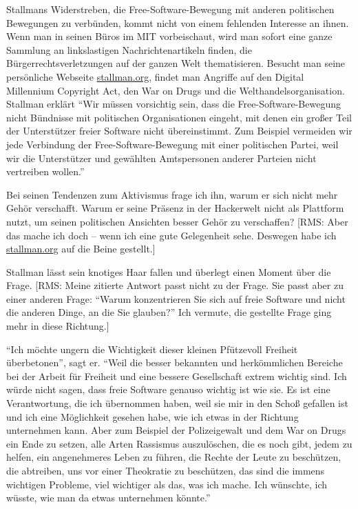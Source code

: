 Stallmans Widerstreben, die Free-Software-Bewegung mit anderen politischen Bewegungen zu verbünden, kommt nicht von einem fehlenden Interesse an ihnen. Wenn man in seinen Büros im MIT vorbeischaut, wird man sofort eine ganze Sammlung an linkslastigen Nachrichtenartikeln finden, die Bürgerrechtsverletzungen auf der ganzen Welt thematisieren. Besucht man seine persönliche Webseite \href{http://stallman.org}{stallman.org}, findet man Angriffe auf den Digital Millennium Copyright Act, den War on Drugs und die Welthandelsorganisation. Stallman erklärt "`Wir müssen vorsichtig sein, dass die Free-Software-Bewegung nicht Bündnisse mit politischen Organisationen eingeht, mit denen ein großer Teil der Unterstützer freier Software nicht übereinstimmt. Zum Beispiel vermeiden wir jede Verbindung der Free-Software-Bewegung mit einer politischen Partei, weil wir die Unterstützer und gewählten Amtspersonen anderer Parteien nicht vertreiben wollen."'

Bei seinen Tendenzen zum Aktivismus frage ich ihn, warum er sich nicht mehr Gehör verschafft. Warum er seine Präsenz in der Hackerwelt nicht als Plattform nutzt, um seinen politischen Ansichten besser Gehör zu verschaffen? [RMS: Aber das mache ich doch – wenn ich eine gute Gelegenheit sehe. Deswegen habe ich \href{http://stallman.org}{stallman.org} auf die Beine gestellt.]

Stallman lässt sein knotiges Haar fallen und überlegt einen Moment über die Frage. [RMS: Meine zitierte Antwort passt nicht zu der Frage. Sie passt aber zu einer anderen Frage: "`Warum konzentrieren Sie sich auf freie Software und nicht die anderen Dinge, an die Sie glauben?"'  Ich vermute, die gestellte Frage ging mehr in diese Richtung.]

"`Ich möchte ungern die Wichtigkeit dieser kleinen Pfützevoll Freiheit überbetonen"', sagt er. "`Weil die besser bekannten und herkömmlichen Bereiche bei der Arbeit für Freiheit und eine bessere Gesellschaft extrem wichtig sind. Ich würde nicht sagen, dass freie Software genauso wichtig ist wie sie. Es ist eine Verantwortung, die ich übernommen haben, weil sie mir in den Schoß gefallen ist und ich eine Möglichkeit gesehen habe, wie ich etwas in der Richtung unternehmen kann. Aber zum Beispiel der Polizeigewalt und dem War on Drugs ein Ende zu setzen, alle Arten Rassismus auszulöschen, die es noch gibt, jedem zu helfen, ein angenehmeres Leben zu führen, die Rechte der Leute zu beschützen, die abtreiben, uns vor einer Theokratie zu beschützen, das sind die immens wichtigen Probleme, viel wichtiger als das, was ich mache. Ich wünschte, ich wüsste, wie man da etwas unternehmen könnte."'

